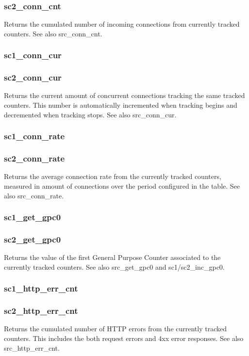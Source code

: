 \subsubsection{sc2\_conn\_cnt}
  Returns the cumulated number of incoming connections from currently tracked
  counters. See also src\_conn\_cnt.

\subsubsection{sc1\_conn\_cur}
\subsubsection{sc2\_conn\_cur}
  Returns the current amount of concurrent connections tracking the same
  tracked counters. This number is automatically incremented when tracking
  begins and decremented when tracking stops. See also src\_conn\_cur.

\subsubsection{sc1\_conn\_rate}
\subsubsection{sc2\_conn\_rate}
  Returns the average connection rate from the currently tracked counters,
  measured in amount of connections over the period configured in the table.
  See also src\_conn\_rate.

\subsubsection{sc1\_get\_gpc0}
\subsubsection{sc2\_get\_gpc0}
  Returns the value of the first General Purpose Counter associated to the
  currently tracked counters. See also src\_get\_gpc0 and sc1/sc2\_inc\_gpc0.

\subsubsection{sc1\_http\_err\_cnt}
\subsubsection{sc2\_http\_err\_cnt}
  Returns the cumulated number of HTTP errors from the currently tracked
  counters. This includes the both request errors and 4xx error responses.
  See also src\_http\_err\_cnt.


